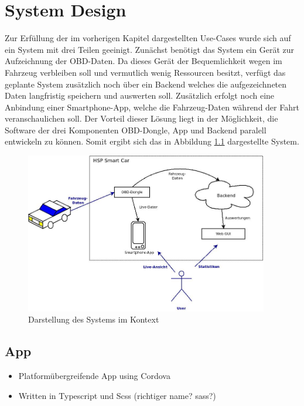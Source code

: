 \chapter{System Design}
\label{sec:systemDesign}
Zur Erfüllung der im vorherigen Kapitel dargestellten Use-Cases wurde sich auf ein System mit drei Teilen geeinigt. Zunächst benötigt das System ein Gerät zur Aufzeichnung der OBD-Daten. Da dieses Gerät der Bequemlichkeit wegen im Fahrzeug verbleiben soll und vermutlich wenig Ressourcen besitzt, verfügt das geplante System zusätzlich noch über ein Backend welches die aufgezeichneten Daten langfristig speichern und auswerten soll. Zusätzlich erfolgt noch eine Anbindung einer Smartphone-App, welche die Fahrzeug-Daten während der Fahrt veranschaulichen soll. Der Vorteil dieser Lösung liegt in der Möglichkeit, die Software der drei Komponenten OBD-Dongle, App und Backend paralell entwickeln zu können. Somit ergibt sich das in Abbildung \ref{fig:SysArch} dargestellte System.
\begin{figure}[h]
  \begin{center}
    \includegraphics[height=7cm,keepaspectratio]{./img/SysArch}
    \caption{Darstellung des Systems im Kontext}
    \label{fig:SysArch}
  \end{center}
\end{figure}



\section{App}
\begin{itemize}
\item Platformübergreifende App using Cordova
\item Written in Typescript und Scss (richtiger name? sass?)
\end{itemize}

